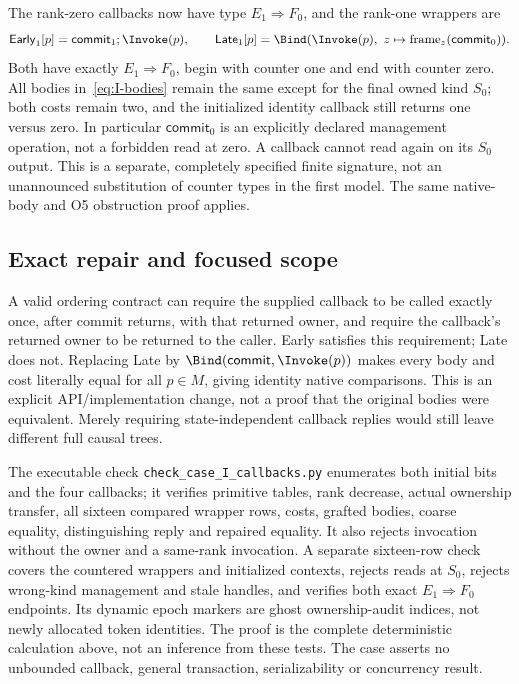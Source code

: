 The rank-zero callbacks now have type $E_1\Rightarrow F_0$, and the
rank-one wrappers are
\[
\mathsf{Early}_1[p]=\mathsf{commit}_1;\Invoke(p),\qquad
\mathsf{Late}_1[p]=\Bind(\Invoke(p),\ z\mapsto
                                    \operatorname{frame}_z(\mathsf{commit}_0)).
\]
Both have exactly $E_1\Rightarrow F_0$, begin with counter one and end
with counter zero. All bodies in~\eqref{eq:I-bodies} remain the same
except for the final owned kind $S_0$; both costs remain two, and the
initialized identity callback still returns one versus zero. In
particular $\mathsf{commit}_0$ is an explicitly declared management
operation, not a forbidden read at zero. A callback cannot read again
on its $S_0$ output. This is a separate, completely specified finite
signature, not an unannounced substitution of counter types in the first
model. The same native-body and O5 obstruction proof applies.

\subsection{Exact repair and focused scope}
A valid ordering contract can require the supplied callback to be called
exactly once, after commit returns, with that returned owner, and require
the callback's returned owner to be returned to the caller. Early satisfies
this requirement; Late does not. Replacing Late by
$\Bind(\mathsf{commit},\Invoke(p))$ makes every body and cost literally
equal for all $p\in M$, giving identity native comparisons. This is an
explicit API/implementation change, not a proof that the original bodies
were equivalent. Merely requiring state-independent callback replies
would still leave different full causal trees.

The executable check \texttt{check\_case\_I\_callbacks.py} enumerates
both initial bits and the four callbacks; it verifies primitive tables,
rank decrease, actual ownership transfer, all sixteen compared wrapper
rows, costs, grafted bodies, coarse equality, distinguishing reply and
repaired equality. It also rejects invocation without the owner and a
same-rank invocation. A separate sixteen-row check covers the countered
wrappers and initialized contexts, rejects reads at $S_0$, rejects
wrong-kind management and stale handles, and verifies both exact
$E_1\Rightarrow F_0$ endpoints. Its dynamic epoch markers are ghost
ownership-audit indices, not newly allocated token identities. The proof is the complete deterministic calculation
above, not an inference from these tests. The case asserts no unbounded
callback, general transaction, serializability or concurrency result.

